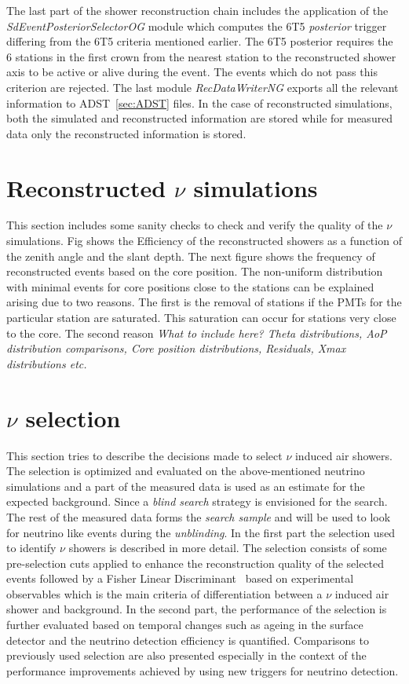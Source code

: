The last part of the shower reconstruction chain includes the application of the \textit{SdEventPosteriorSelectorOG} module which computes the 6T5 \textit{posterior} trigger differing from the 6T5 criteria mentioned earlier. The 6T5 posterior requires the 6 stations in the first crown from the nearest station to the reconstructed shower axis to be active or alive during the event. The events which do not pass this criterion are rejected. The last module \textit{RecDataWriterNG} exports all the relevant information to ADST~\ref{sec:ADST} files. In the case of reconstructed simulations, both the simulated and reconstructed information are stored while for measured data only the reconstructed information is stored.

\section{Reconstructed \texorpdfstring{$\nu$}{} simulations}
\label{sec:reco_possel}
This section includes some sanity checks to check and verify the quality of the $\nu$ simulations. Fig shows the Efficiency of the reconstructed showers as a function of the zenith angle and the slant depth. The next figure shows the frequency of reconstructed events based on the core position. The non-uniform distribution with minimal events for core positions close to the stations can be explained arising due to two reasons. The first is the removal of stations if the PMTs for the particular station are saturated. This saturation can occur for stations very close to the core. The second reason  
\textit{What to include here? Theta distributions, AoP distribution comparisons, Core position distributions, Residuals, Xmax distributions etc.}

\section{\texorpdfstring{$\nu$}{} selection}
\label{sec:nu_sel}
This section tries to describe the decisions made to select $\nu$ induced air showers. The selection is optimized and evaluated on the above-mentioned neutrino simulations and a part of the measured data is used as an estimate for the expected background. Since a \textit{blind search} strategy is envisioned for the search. The rest of the measured data forms the \textit{search sample} and will be used to look for neutrino like events during the \textit{unblinding}. 
In the first part the selection used to identify $\nu$ showers is described in more detail. The selection consists of some pre-selection cuts applied to enhance the reconstruction quality of the selected events followed by a Fisher Linear Discriminant~\cite{Fisher_illustrative} based on experimental observables which is the main criteria of differentiation between a $\nu$ induced air shower and background.  
In the second part, the performance of the selection is further evaluated based on temporal changes such as ageing in the surface detector and the neutrino detection efficiency is quantified. Comparisons to previously used selection are also presented especially in the context of the performance improvements achieved by using new triggers for neutrino detection.

